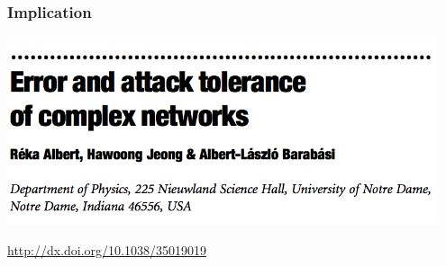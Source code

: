 \documentclass[aspectratio=169]{beamer}
\begin{document}
\begin{frame}
\frametitle{Implication}

\begin{center}
\includegraphics[width = 0.95\textwidth]{figures/albert_error_2000_title}
\end{center}

\vfill
\url{http://dx.doi.org/10.1038/35019019}

\end{frame}
%
%
%
\end{document}
